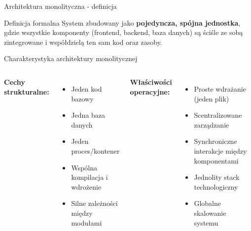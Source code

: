 \documentclass[aspectratio=169,xcolor=table]{beamer}
\begin{document}
\begin{frame}{Architektura monolityczna - definicja}
  \begin{block}{Definicja formalna}
    System zbudowany jako \textbf{pojedyncza, spójna jednostka}, gdzie wszystkie komponenty (frontend, backend, baza danych) są ściśle ze sobą zintegrowane i współdzielą ten sam kod oraz zasoby.
  \end{block}
  
  \begin{center}
  \end{center}
\end{frame}

\begin{frame}{Charakterystyka architektury monolitycznej}
  \begin{columns}
    \textbf{Cechy strukturalne:}
    \begin{itemize}
      \item Jeden kod bazowy
      \item Jedna baza danych
      \item Jeden proces/kontener
      \item Wspólna kompilacja i wdrożenie
      \item Silne zależności między modułami
    \end{itemize}
    
    \textbf{Właściwości operacyjne:}
    \begin{itemize}
      \item Proste wdrażanie (jeden plik)
      \item Scentralizowane zarządzanie
      \item Synchroniczne interakcje między komponentami
      \item Jednolity stack technologiczny
      \item Globalne skalowanie systemu
    \end{itemize}
  \end{columns}
\end{frame}
\end{document}
